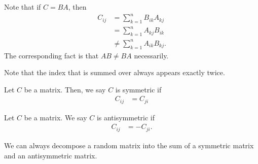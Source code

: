 \documentclass[10pt]{mypackage}
\begin{document}
Note that if $C = BA$, then
\begin{align*}
  C_{ij} &= \sum_{k=1}^{n}B_{ik}A_{kj}\\
         &= \sum_{k=1}^{n}A_{kj}B_{ik}\\
         &\neq \sum_{k=1}^{n}A_{ik}B_{kj}.
\end{align*}
The corresponding fact is that $AB\neq BA$ necessarily.\newline

Note that the index that is summed over always appears exactly twice.
\begin{definition}
  Let $C$ be a matrix. Then, we say $C$ is symmetric if
  \begin{align*}
    C_{ij} &= C_{ji}
  \end{align*}
\end{definition}
\begin{definition}
  Let $C$ be a matrix. We say $C$ is antisymmetric if
  \begin{align*}
    C_{ij} &= -C_{ji}.
  \end{align*}
\end{definition}
We can always decompose a random matrix into the sum of a symmetric matrix and an antisymmetric matrix.
\end{document}
